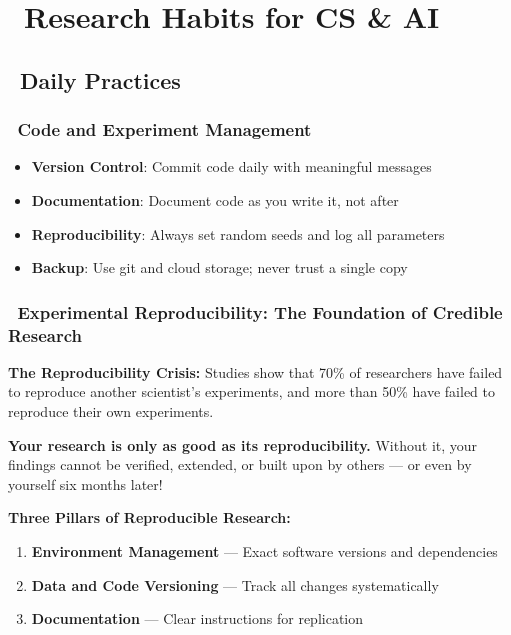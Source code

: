 \documentclass[11pt,a4paper]{article}
\begin{document}
\section{\faFlask~Research Habits for CS \& AI}

\subsection{\faClock~Daily Practices}

\subsubsection{\faCode~Code and Experiment Management}
\begin{itemize}
    \item \textbf{Version Control}: Commit code daily with meaningful messages
    \item \textbf{Documentation}: Document code as you write it, not after
    \item \textbf{Reproducibility}: Always set random seeds and log all parameters
    \item \textbf{Backup}: Use git and cloud storage; never trust a single copy
\end{itemize}

\subsubsection{\faSync~Experimental Reproducibility: The Foundation of Credible Research}

\begin{tcolorbox}[colback=blue!5,colframe=blue!40,title={\faExclamationCircle~Why Reproducibility Matters}]
\textbf{The Reproducibility Crisis:} Studies show that 70\% of researchers have failed to reproduce another scientist's experiments, and more than 50\% have failed to reproduce their own experiments.

\textbf{Your research is only as good as its reproducibility.} Without it, your findings cannot be verified, extended, or built upon by others — or even by yourself six months later!
\end{tcolorbox}

\textbf{Three Pillars of Reproducible Research:}

\begin{enumerate}
    \item \textbf{Environment Management} — Exact software versions and dependencies
    \item \textbf{Data and Code Versioning} — Track all changes systematically
    \item \textbf{Documentation} — Clear instructions for replication
\end{enumerate}
\end{document}
